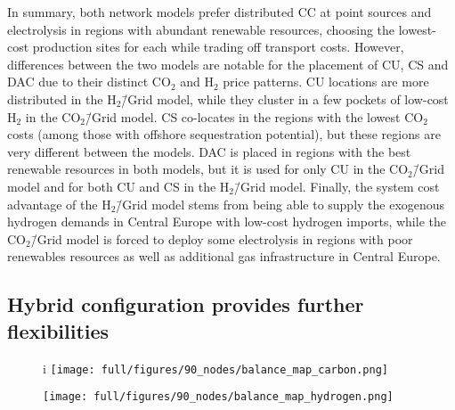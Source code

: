 \documentclass[twocolumn]{article}
\newcommand{\COtwo}{CO$_2$}
\newcommand{\Htwo}{H$_2$}
\newcommand{\modCO}{CO$_2$\=/Grid model}
\newcommand{\modH}{H$_2$\=/Grid model}
\newcommand{\carbon}{CO$_2$}
\newcommand{\hydrogen}{H$_2$}
\newcommand{\hybridmodel}{Hybrid model}
\begin{document}
In summary, both network models prefer distributed CC at point sources and electrolysis in regions with abundant renewable resources, choosing the lowest-cost production sites for each while trading off transport costs. However, differences between the two models are notable for the placement of CU, CS and DAC due to their distinct \COtwo{} and \Htwo{} price patterns. CU locations are more distributed in the \modH{}, while they cluster in a few pockets of low-cost \Htwo{} in the \modCO{}. CS co-locates in the regions with the lowest \COtwo{} costs (among those with offshore sequestration potential), but these regions are very different between the models. DAC is placed in regions with the best renewable resources in both models, but it is used for only CU in the \modCO{} and for both CU and CS in the \modH{}. Finally, the system cost advantage of the \modH{} stems from being able to supply the exogenous hydrogen demands in Central Europe with low-cost hydrogen imports, while the \modCO{} is forced to deploy some electrolysis in regions with poor renewables resources as well as additional gas infrastructure in Central Europe.


\subsection*{Hybrid configuration provides further flexibilities}\label{subsec:Hybrid}

\begin{figure*}[ht!]
    \centering
    \begin{subfigure}{.5\textwidth}
i        \centering
        \texttt{[image: full/figures/90\_nodes/balance\_map\_carbon.png]}
        \label{fig:capacity_map_carbon_co2}
    \end{subfigure}%
    \begin{subfigure}{.5\textwidth}
        \centering
        \texttt{[image: full/figures/90\_nodes/balance\_map\_hydrogen.png]}
        \label{fig:capacity_map_hydrogen_co2}
    \end{subfigure}
    \caption{Optimal operation, flows and prices of the carbon (left) and hydrogen (right) sectors for the \hybridmodel{} in the net zero scenario. For each region, upper semicircles show the average production per technology, lower semicircles the consumption, and colors the average marginal prices. Carbon Sequestration offshore are drawn as full circles. Lines and arrows show the interregional transportation. \carbon{} from point-source in the inland either supplies local CU with imported \hydrogen{} or facilitates sequestration in nearby offshore regions.
    }
    \label{fig:capacity_maps}
\end{figure*}
\end{document}
